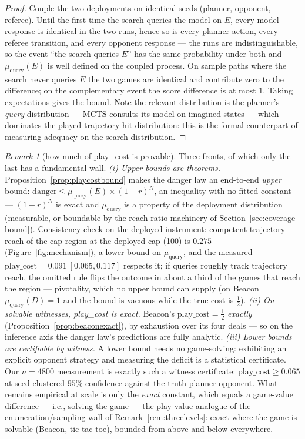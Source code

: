 \documentclass[11pt]{article}
\theoremstyle{remark}
\newtheorem{remark}{Remark}
\begin{document}
\begin{proof}
Couple the two deployments on identical seeds (planner, opponent, referee). Until the first time the search queries the model on $E$, every model response is identical in the two runs, hence so is every planner action, every referee transition, and every opponent response --- the runs are indistinguishable, so the event ``the search queries $E$'' has the same probability under both and $\mu_{\mathrm{query}}(E)$ is well defined on the coupled process. On sample paths where the search never queries $E$ the two games are identical and contribute zero to the difference; on the complementary event the score difference is at most $1$. Taking expectations gives the bound. Note the relevant distribution is the planner's \emph{query} distribution --- MCTS consults its model on imagined states --- which dominates the played-trajectory hit distribution: this is the formal counterpart of measuring adequacy on the search distribution.
\end{proof}

\begin{remark}[how much of play\_cost is provable]
\label{rem:playcost-provable}
Three fronts, of which only the last has a fundamental wall. \emph{(i) Upper bounds are theorems.} Proposition~\ref{prop:playcostbound} makes the danger law an end-to-end \emph{upper} bound: $\mathrm{danger} \leq \mu_{\mathrm{query}}(E) \times (1-r)^N$, an inequality with no fitted constant --- $(1-r)^N$ is exact and $\mu_{\mathrm{query}}$ is a property of the deployment distribution (measurable, or boundable by the reach-ratio machinery of Section~\ref{sec:coverage-bound}). Consistency check on the deployed instrument: competent trajectory reach of the cap region at the deployed cap (100) is $0.275$ (Figure~\ref{fig:mechanism}), a lower bound on $\mu_{\mathrm{query}}$, and the measured $\mathrm{play\_cost} = 0.091~[0.065, 0.117]$ respects it; if queries roughly track trajectory reach, the omitted rule flips the outcome in about a third of the games that reach the region --- pivotality, which no upper bound can supply (on Beacon $\mu_{\mathrm{query}}(D) = 1$ and the bound is vacuous while the true cost is $\tfrac12$). \emph{(ii) On solvable witnesses, play\_cost is exact.} Beacon's $\mathrm{play\_cost} = \tfrac12$ \emph{exactly} (Proposition~\ref{prop:beaconexact}), by exhaustion over its four deals --- so on the inference axis the danger law's predictions are fully analytic. \emph{(iii) Lower bounds are certifiable by witness.} A lower bound needs no game-solving: exhibiting an explicit opponent strategy and measuring the deficit is a statistical certificate. Our $n=4800$ measurement is exactly such a witness certificate: $\mathrm{play\_cost} \geq 0.065$ at seed-clustered $95\%$ confidence against the truth-planner opponent. What remains empirical at scale is only the \emph{exact} constant, which equals a game-value difference --- i.e., solving the game --- the play-value analogue of the enumeration/sampling wall of Remark~\ref{rem:threelevels}: exact where the game is solvable (Beacon, tic-tac-toe), bounded from above and below everywhere.
\end{remark}
\end{document}
